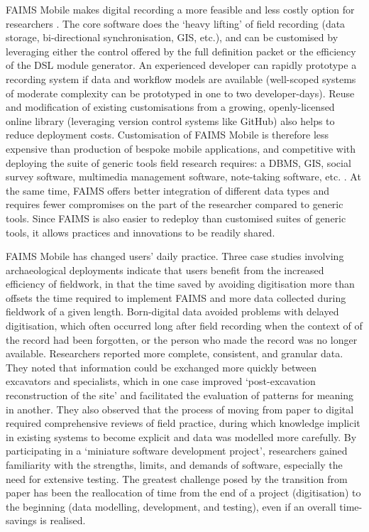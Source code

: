 \documentclass[preprint,12pt, a4paper]{elsarticle}
\begin{document}
FAIMS Mobile makes digital recording a more feasible and less costly option for researchers \cite{Sobotkova2016-mx, Sobotkova2015-lq}. The core software does the `heavy lifting' of field recording (data storage, bi-directional synchronisation, GIS, etc.), and can be customised by leveraging either the control offered by the full definition packet or the efficiency of the DSL module generator. An experienced developer can rapidly prototype a recording system if data and workflow models are available (well-scoped systems of moderate complexity can be prototyped in one to two developer-days). Reuse and modification of existing customisations from a growing, openly-licensed online library (leveraging version control systems like GitHub) also helps to reduce deployment costs\cite{Ross2015-mo}. Customisation of FAIMS Mobile is therefore less expensive than production of bespoke mobile applications, and competitive with deploying the suite of generic tools field research requires: a DBMS, GIS, social survey software, multimedia management software, note-taking software, etc. \cite{Carter2016-jm}. At the same time, FAIMS offers better integration of different data types and requires fewer compromises on the part of the researcher compared to generic tools. Since FAIMS is also easier to redeploy than customised suites of generic tools, it allows practices and innovations to be readily shared\cite{Ross2015-mo}.  

FAIMS Mobile has changed users' daily practice. Three case studies involving archaeological deployments \cite{Sobotkova2016-mx} indicate that users benefit from the increased efficiency of fieldwork, in that the time saved by avoiding digitisation more than offsets the time required to implement FAIMS and more data collected during fieldwork of a given length. Born-digital data avoided problems with delayed digitisation, which often occurred long after field recording when the context of of the record had been forgotten, or the person who made the record was no longer available. Researchers reported more complete, consistent, and granular data. They noted that information could be exchanged more quickly between excavators and specialists, which in one case improved `post-excavation reconstruction of the site' and facilitated the evaluation of patterns for meaning in another. They also observed that the process of moving from paper to digital required comprehensive reviews of field practice, during which knowledge implicit in existing systems to become explicit and data was modelled more carefully. By participating in a `miniature software development project', researchers gained familiarity with the strengths, limits, and demands of software, especially the need for extensive testing. The greatest challenge posed by the transition from paper has been the reallocation of time from the end of a project (digitisation) to the beginning (data modelling, development, and testing), even if an overall time-savings is realised. 
\end{document}
